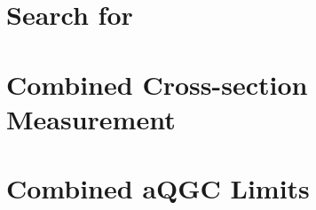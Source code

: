 
\section{Search for \wwwlljj}
\section{Combined Cross-section Measurement}
\section{Combined aQGC Limits}


